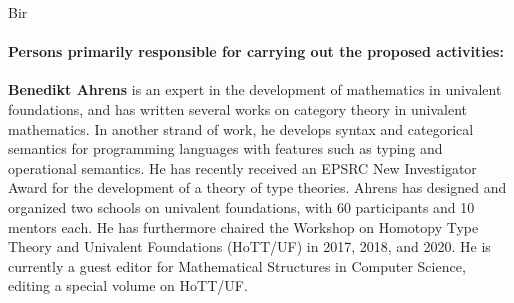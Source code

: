 \begin{sitedescription}{Bir}



\paragraph*{Persons primarily responsible for carrying out the proposed activities:}

\begin{compactitem}
 \item 
\textbf{Benedikt Ahrens} is an expert in the development of mathematics in univalent foundations, and has written several works on category theory in univalent mathematics.
In another strand of work, he develops syntax and categorical semantics for programming languages with features such as typing and operational semantics.
He has recently received an EPSRC New Investigator Award for the development of a theory of type theories.
Ahrens has designed and organized two schools on univalent foundations, with 60 participants and 10 mentors each. He has furthermore chaired the Workshop on Homotopy Type Theory and Univalent Foundations (HoTT/UF) in 2017, 2018, and 2020. He is currently a guest editor for Mathematical Structures in Computer Science, editing a special volume on HoTT/UF.
\end{compactitem}






\end{sitedescription}

